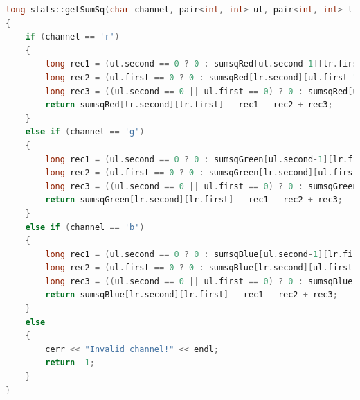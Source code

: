\documentclass[UTF8]{ctexart}
\begin{document}
\begin{lstlisting}[language=C++,caption={twoDTree.cpp},label={twoDTree.cpp}]
long stats::getSumSq(char channel, pair<int, int> ul, pair<int, int> lr)                                                                                    
{                                                                                                                                                         
    if (channel == 'r')                                                                                                                                   
    {
        long rec1 = (ul.second == 0 ? 0 : sumsqRed[ul.second-1][lr.first]);
        long rec2 = (ul.first == 0 ? 0 : sumsqRed[lr.second][ul.first-1]);
        long rec3 = ((ul.second == 0 || ul.first == 0) ? 0 : sumsqRed[ul.second-1][ul.first-1]);
        return sumsqRed[lr.second][lr.first] - rec1 - rec2 + rec3;             
    }
    else if (channel == 'g')                                                                                                                              
    {
        long rec1 = (ul.second == 0 ? 0 : sumsqGreen[ul.second-1][lr.first]);
        long rec2 = (ul.first == 0 ? 0 : sumsqGreen[lr.second][ul.first-1]);
        long rec3 = ((ul.second == 0 || ul.first == 0) ? 0 : sumsqGreen[ul.second-1][ul.first-1]);
        return sumsqGreen[lr.second][lr.first] - rec1 - rec2 + rec3;        
    }
    else if (channel == 'b')                                                                                                                              
    {
        long rec1 = (ul.second == 0 ? 0 : sumsqBlue[ul.second-1][lr.first]);
        long rec2 = (ul.first == 0 ? 0 : sumsqBlue[lr.second][ul.first-1]);
        long rec3 = ((ul.second == 0 || ul.first == 0) ? 0 : sumsqBlue[ul.second-1][ul.first-1]);
        return sumsqBlue[lr.second][lr.first] - rec1 - rec2 + rec3;            
    }
    else                                                                                                                                                  
    {                                                                                                                                                     
        cerr << "Invalid channel!" << endl;                                                                                                               
        return -1;                                                                                                                                        
    }                                                                                                                                                     
}  


\end{lstlisting}
\end{document}
